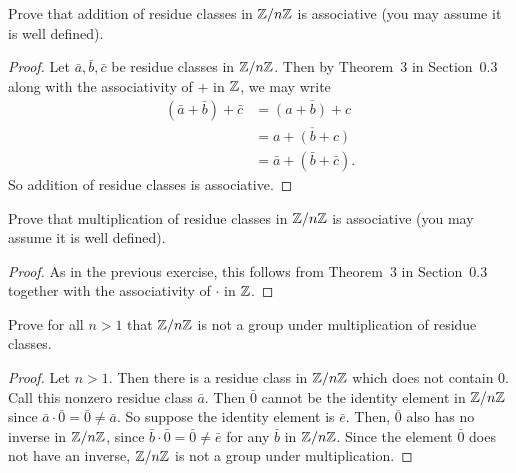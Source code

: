  Prove that addition of residue classes in $\mathbb{Z}/n\mathbb{Z}$ is
associative (you may assume it is well defined).
\begin{proof}
  Let $\bar{a}, \bar{b}, \bar{c}$ be residue classes in $\mathbb{Z}/n\mathbb{Z}$. Then
  by Theorem~3 in Section~0.3 along with the associativity of $+$ in
  $\mathbb{Z}$, we may write
  \begin{align*}
    (\bar{a} + \bar{b}) + \bar{c}
    &= \overline{(a + b) + c} \\
    &= \overline{a + (b + c)} \\
    &= \bar{a} + (\bar{b} + \bar{c}).
  \end{align*}
  So addition of residue classes is associative.
\end{proof}

 Prove that multiplication of residue classes in $\mathbb{Z}/n\mathbb{Z}$ is
associative (you may assume it is well defined).
\begin{proof}
  As in the previous exercise, this follows from Theorem~3 in
  Section~0.3 together with the associativity of $\cdot$ in $\mathbb{Z}$.
\end{proof}

 Prove for all $n>1$ that $\mathbb{Z}/n\mathbb{Z}$ is not a group under
multiplication of residue classes.
\begin{proof}
  Let $n>1$. Then there is a residue class in $\mathbb{Z}/n\mathbb{Z}$ which does not
  contain $0$. Call this nonzero residue class $\bar{a}$. Then $\bar0$
  cannot be the identity element in $\mathbb{Z}/n\mathbb{Z}$ since
  $\bar{a}\cdot\bar0 = \bar0 \neq \bar{a}$. So suppose the identity
  element is $\bar{e}$. Then, $\bar0$ also has no inverse in $\mathbb{Z}/n\mathbb{Z}$,
  since $\bar{b}\cdot\bar0 = \bar0 \neq \bar{e}$ for any $\bar{b}$ in
  $\mathbb{Z}/n\mathbb{Z}$. Since the element $\bar0$ does not have an inverse,
  $\mathbb{Z}/n\mathbb{Z}$ is not a group under multiplication.
\end{proof}


